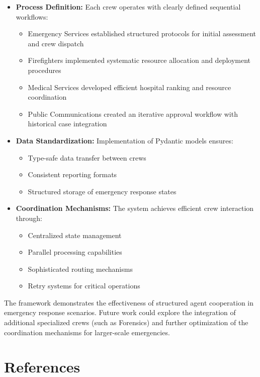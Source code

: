 \documentclass[12pt,a4paper,twocolumn]{article}
\begin{document}
\begin{itemize}
    \item \textbf{Process Definition:} Each crew operates with clearly defined sequential workflows:
    \begin{itemize}
        \item Emergency Services established structured protocols for initial assessment and crew dispatch
        \item Firefighters implemented systematic resource allocation and deployment procedures
        \item Medical Services developed efficient hospital ranking and resource coordination
        \item Public Communications created an iterative approval workflow with historical case integration
    \end{itemize}
    
    \item \textbf{Data Standardization:} Implementation of Pydantic models ensures:
    \begin{itemize}
        \item Type-safe data transfer between crews
        \item Consistent reporting formats
        \item Structured storage of emergency response states
    \end{itemize}
    
    \item \textbf{Coordination Mechanisms:} The system achieves efficient crew interaction through:
    \begin{itemize}
        \item Centralized state management
        \item Parallel processing capabilities
        \item Sophisticated routing mechanisms
        \item Retry systems for critical operations
    \end{itemize}
\end{itemize}

The framework demonstrates the effectiveness of structured agent cooperation in emergency response scenarios. Future work could explore the integration of additional specialized crews (such as Forensics) and further optimization of the coordination mechanisms for larger-scale emergencies.

\section{References}


\end{document}
